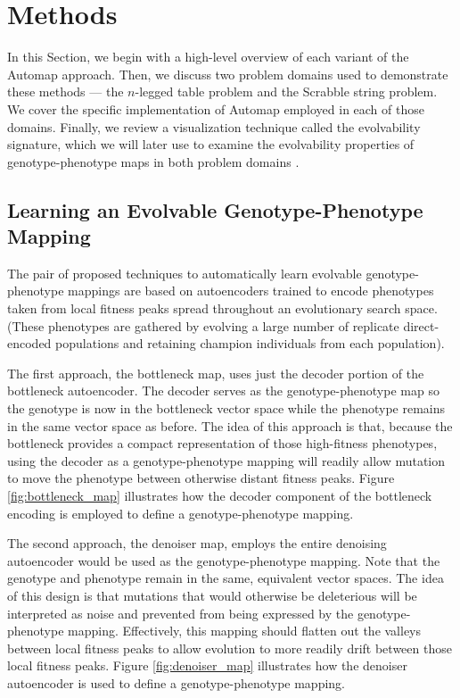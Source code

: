 \section{Methods} \label{sec:methods}

In this Section, we begin with a high-level overview of each variant of the Automap approach.
Then, we discuss two problem domains used to demonstrate these methods --- the $n$-legged table problem and the Scrabble string problem.
We cover the specific implementation of Automap employed in each of those domains.
Finally, we review a visualization technique called the evolvability signature, which we will later use to examine the evolvability properties of genotype-phenotype maps in both problem domains  \cite{tarapore2015evolvability}.

\subsection{Learning an Evolvable Genotype-Phenotype Mapping}

The pair of proposed techniques to automatically learn evolvable genotype-phenotype mappings are based on autoencoders trained to encode phenotypes taken from local fitness peaks spread throughout an evolutionary search space.
(These phenotypes are gathered by evolving a large number of replicate direct-encoded populations and retaining champion individuals from each population).



The first approach, the bottleneck map, uses just the decoder portion of the bottleneck autoencoder.
The decoder serves as the genotype-phenotype map so the genotype is now in the bottleneck vector space while the phenotype remains in the same vector space as before.
The idea of this approach is that, because the bottleneck provides a compact representation of those high-fitness phenotypes, using the decoder as a genotype-phenotype mapping will readily allow mutation to move the phenotype between otherwise distant fitness peaks.
Figure \ref{fig:bottleneck_map} illustrates how the decoder component of the bottleneck encoding is employed to define a genotype-phenotype mapping.

The second approach, the denoiser map, employs the entire denoising autoencoder would be used as the genotype-phenotype mapping.
Note that the genotype and phenotype remain in the same, equivalent vector spaces.
The idea of this design is that mutations that would otherwise be deleterious will be interpreted as noise and prevented from being expressed by the genotype-phenotype mapping.
Effectively, this mapping should flatten out the valleys between local fitness peaks to allow evolution to more readily drift between those local fitness peaks.
Figure \ref{fig:denoiser_map} illustrates how the denoiser autoencoder is used to define a genotype-phenotype mapping.

